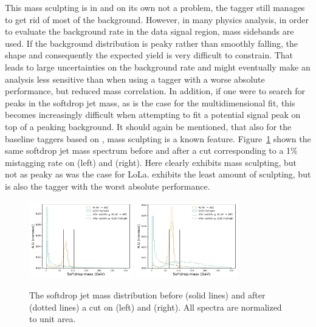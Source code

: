 This mass sculpting is in and on its own not a problem, the tagger still manages to get rid of most of the background. However, in many physics analysis, in order to evaluate the background rate in the data signal region, mass sidebands are used. If the background distribution is peaky rather than smoothly falling, the shape and consequently the expected yield is very difficult to constrain. That leads to large uncertainties on the background rate and might eventually make an analysis less sensitive than when using a tagger with a worse absolute performance, but reduced mass correlation. In addition, if one were to search for peaks in the softdrop jet mass, as is the case for the multidimensional fit, this becomes increasingly difficult when attempting to fit a potential signal peak on top of a peaking background.\newline
It should again be mentioned, that also for the baseline taggers based on \nsubj, mass sculpting is a known feature. Figure~\ref{fig:lola:masssculpttau} shown the same softdrop jet mass spectrum before and after a cut corresponding to a 1\% mistagging rate on \nsubj (left) and \ddt (right). Here \nsubj clearly exhibits mass sculpting, but not as peaky as was the case for LoLa. \ddt exhibits the least amount of sculpting, but is also the tagger with the worst absolute performance.\par 
\begin{figure}[h!]
\centering
\includegraphics[width=0.4\textwidth]{figures/vtagging/lola/wLola_v6_500rew-mass-afterCut-ddt_normed.png}
\includegraphics[width=0.4\textwidth]{figures/vtagging/lola/wLola_v6_500rew-mass-afterCut-jtau21_normed.png}
\caption{The softdrop jet mass distribution before (solid lines) and after (dotted lines) a cut on \nsubj (left) and \ddt (right). All spectra are normalized to unit area.}
\label{fig:lola:masssculpttau}
\end{figure}


